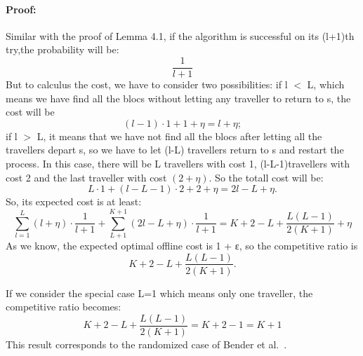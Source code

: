 \documentclass[a4paper, 10pt]{article}
\begin{document}
\paragraph{Proof:}Similar with the proof of Lemma 4.1, if the algorithm is successful on its (l+1)th try,the probability will be: 
\[
\frac{1}{l+1}
\]
But to calculus the cost, we have to consider two possibilities: 
if l $<$ L, which means we have find all the blocs without letting any traveller to return to s, the cost will be 
\[
(l-1)\cdot1 + 1 +\eta = l + \eta;
\]
if l $>$ L, it means that we have not find all the blocs after letting all the travellers depart s,  so we have to let (l-L) travellers return to s and restart the process. In this case, there will be L travellers with cost 1, (l-L-1)travellers with cost 2 and the last traveller with cost $(2+\eta)$. So the totall cost will be:
\[
L\cdot 1 + (l-L-1)\cdot2 + 2 +\eta = 2l - L + \eta .
\]
So, its expected cost is at least:
\begin{displaymath}
\sum_{l=1}^{L}(l+\eta)\cdot \frac{1}{l+1} 
+ \sum_{L+1}^{K+1}(2l-L+\eta)\cdot \frac{1}{l+1}
=K+2-L+ \frac{L(L-1)}{2(K+1)} + \eta
\end{displaymath}
As we know, the expected optimal offline cost is 1 + ε, so the competitive ratio is 
\[
K+2-L+ \frac{L(L-1)}{2(K+1)}.
\]

If we consider the special case L=1 which means only one traveller, the competitive ratio becomes:
\[
K+2-L+ \frac{L(L-1)}{2(K+1)} = K+2-1 = K+1
\]
This result corresponds to the randomized case of Bender et al.~\cite{BeWe15}.



\end{document}

